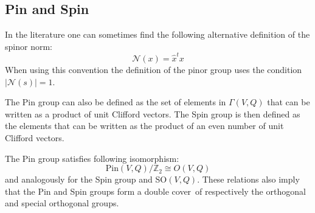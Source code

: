 \subsection{Pin and Spin}

	\begin{remark}
		In the literature one can sometimes find the following alternative definition of the spinor norm:
		\begin{equation}
			\mathcal{N}(x) = \hat{x}^tx
		\end{equation}
		When using this convention the definition of the pinor group uses the condition $|\mathcal{N}(s)| = 1$.
	\end{remark}

	\begin{adefinition}
		The Pin group can also be defined as the set of elements in $\Gamma(V, Q)$ that can be written as a product of unit Clifford vectors. The Spin group is then defined as the elements that can be written as the product of an even number of unit Clifford vectors.
	\end{adefinition}
	
	\begin{property}
		The Pin group satisfies following isomorphism:
		\begin{equation}
			\text{Pin}(V, Q)/\mathbb{Z}_2 \cong O(V, Q)
		\end{equation}
		and analogously for the Spin group and SO$(V, Q)$. These relations also imply that the Pin and Spin groups form a double cover\footnotemark\ of respectively the orthogonal and special orthogonal groups.
	\end{property}
	
